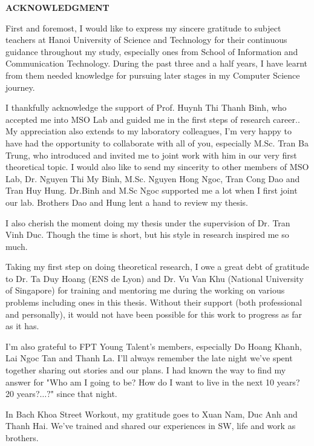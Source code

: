 % 
\begin{center}
    \Large{\textbf{ACKNOWLEDGMENT}}\\
\end{center}
\vspace{1cm}

First and foremost, I would like to express my sincere gratitude to subject teachers at Hanoi University of Science and Technology for their continuous guidance throughout my study, especially ones from School of Information and Communication Technology. During the past three and a half years, I have learnt from them needed knowledge for pursuing later stages in my Computer Science journey.

I thankfully acknowledge the support of Prof. Huynh Thi Thanh Binh, who accepted me into MSO Lab and {\color{blue}guided me in the first steps of research career.}. My appreciation also extends to my laboratory colleagues, I'm very happy to have had the opportunity to collaborate with all of you, especially M.Sc. Tran Ba Trung, who introduced and invited me to joint work with him in our very first theoretical topic. I would also like to send my sincerity to other members of MSO Lab, Dr. Nguyen Thi My Binh, M.Sc. Nguyen Hong Ngoc, Tran Cong Dao and Tran Huy Hung. Dr.Binh and M.Sc Ngoc supported me a lot when I first joint our lab. Brothers Dao and Hung lent a hand to review my thesis. 

I also cherish the moment doing my thesis under the supervision of Dr. Tran Vinh Duc. Though the time is short, but his style in research inspired me so much. 

Taking my first step on doing theoretical research, I owe a great debt of gratitude to Dr. Ta Duy Hoang (ENS de Lyon) and Dr. Vu Van Khu (National University of Singapore) for training and mentoring me during the working on various problems including ones in this thesis. Without their support (both professional and personally), it would not have been possible for this work to progress as far as it has. 

I'm also grateful to FPT Young Talent's members, especially Do Hoang Khanh, Lai Ngoc Tan and Thanh La. I'll always remember the late night we've spent together sharing out stories and our plans. I had known the way to find my answer for "Who am I going to be? How do I want to live in the next 10 years? 20 years?$\ldots?$" since that night.

In Bach Khoa Street Workout, my gratitude goes to Xuan Nam, Duc Anh and Thanh Hai. We've trained and shared our experiences in SW, life and  work as brothers. 

